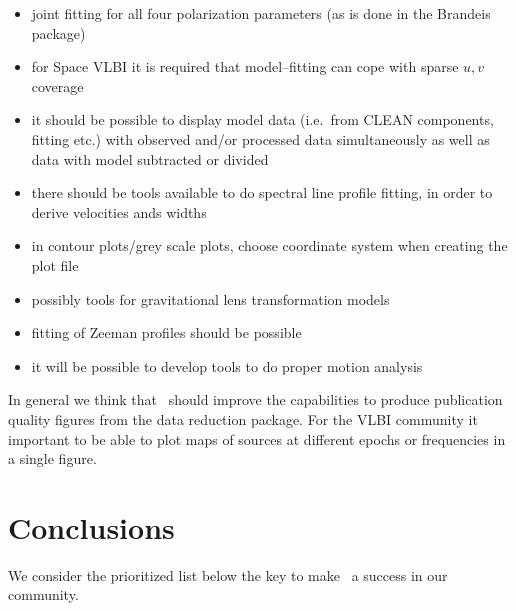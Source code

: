 \begin{itemize}
  
\item joint fitting for all four polarization parameters (as is done in
  the Brandeis package)
  
\item for Space VLBI it is required that model--fitting can cope with
  sparse $u,\! v$ coverage
  
\item it should be possible to display model data (i.e.\ from CLEAN
  components, fitting etc.) with observed and\slash or processed data
  simultaneously as well as data with model subtracted or divided

\item there should be tools available to do spectral line profile
  fitting, in order to derive velocities ands widths

\item in contour plots\slash grey scale plots, choose coordinate
  system when creating the plot file

\item possibly tools for gravitational lens transformation models
   
\item fitting of Zeeman profiles should be possible

\item it will be possible to develop tools to do proper motion analysis

  
\end{itemize}

In general we think that \aipspp\ should improve the capabilities to
produce publication quality figures from the data reduction package. 
For the VLBI community it important to be able to plot maps of sources
at different epochs or frequencies in a single figure.

\section{Conclusions}

We consider the prioritized list below the key to make \aipspp\ a
success in our community.

